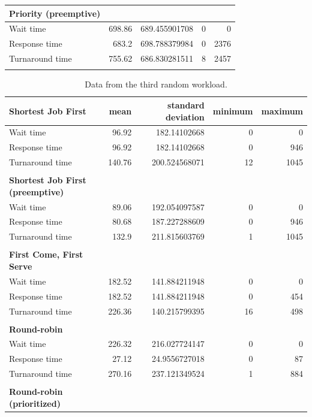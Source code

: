 \documentclass[12pt,letterpaper]{article}
\begin{document}
\begin{appendices}
\begin{table}[H]
\begin{tabular}{l r r r r}
					\\
					\textbf{Priority (preemptive)} \\
					\hline
Wait time &		698.86 &	689.455901708 &	0 &	0 	\\
Response time &		683.2 &	698.788379984 &	0 &	2376 	\\
Turnaround time &	755.62 &	686.830281511 &	8 &	2457 	\\
					\\
				\end{tabular}
			\end{table}

			\begin{table}[H]
	 			\label{table:data-rand3}
	  			\caption{Data from the third random workload.}
		  		\begin{tabular}{l r r r r}
					\textbf{Shortest Job First} & mean & standard deviation & minimum & maximum\\
					\hline
Wait time &		96.92 &	182.14102668 &	0 &	0 	\\
Response time &		96.92 &	182.14102668 &	0 &	946 	\\
Turnaround time &	140.76 &	200.524568071 &	12 &	1045 	\\
					\\
					\textbf{Shortest Job First (preemptive)} \\
					\hline
Wait time &		89.06 &	192.054097587 &	0 &	0 	\\
Response time &		80.68 &	187.227288609 &	0 &	946 	\\
Turnaround time &	132.9 &	211.815603769 &	1 &	1045 	\\
					\\
					\textbf{First Come, First Serve} \\
					\hline
Wait time &		182.52 &	141.884211948 &	0 &	0 	\\
Response time &		182.52 &	141.884211948 &	0 &	454 	\\
Turnaround time &	226.36 &	140.215799395 &	16 &	498 	\\
					\\
					\textbf{Round-robin} \\
					\hline
Wait time &		226.32 &	216.027724147 &	0 &	0 	\\
Response time &		27.12 &	24.9556727018 &	0 &	87 	\\
Turnaround time &	270.16 &	237.121349524 &	1 &	884 	\\
					\\
					\textbf{Round-robin (prioritized)} \\

\end{tabular}
\end{table}
\end{appendices}
\end{document}
